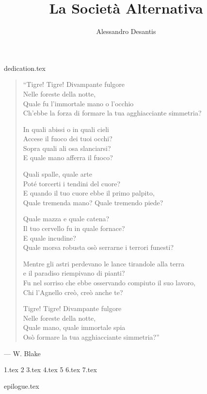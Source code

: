 \documentclass[a4paper,oneside,11pt]{memoir}
\title{La Società Alternativa}
\author{Alessandro Desantis}
\date{}
\begin{document}
    \begin{titlingpage}
        \maketitle
    \end{titlingpage}

    {dedication.tex}
    \begin{dedicationpage}
        \begin{verse}
            \itshape{
            ``Tigre! Tigre! Divampante fulgore\\
            Nelle foreste della notte,\\
            Quale fu l'immortale mano o l'occhio\\
            Ch'ebbe la forza di formare la tua agghiacciante simmetria?

            In quali abissi o in quali cieli\\
            Accese il fuoco dei tuoi occhi?\\
            Sopra quali ali osa slanciarsi?\\
            E quale mano afferra il fuoco?

            Quali spalle, quale arte\\
            Poté torcerti i tendini del cuore?\\
            E quando il tuo cuore ebbe il primo palpito,\\
            Quale tremenda mano? Quale tremendo piede?

            Quale mazza e quale catena?\\
            Il tuo cervello fu in quale fornace?\\
            E quale incudine?\\
            Quale morsa robusta osò serrarne i terrori funesti?

            Mentre gli astri perdevano le lance tirandole alla terra\\
            e il paradiso riempivano di pianti?\\
            Fu nel sorriso che ebbe osservando compiuto il suo lavoro,\\
            Chi l'Agnello creò, creò anche te?

            Tigre! Tigre! Divampante fulgore\\
            Nelle foreste della notte,\\
            Quale mano, quale immortale spia\\
            Osò formare la tua agghiacciante simmetria?''
            \/}
        \end{verse}

        \begin{flushright}
            --- W. Blake
        \end{flushright}
    \end{dedicationpage}


    {1.tex}
    {2}
    {3.tex}
    {4.tex}
    {5}
    {6.tex}
    {7.tex}

    \backmatter

    {epilogue.tex}
\end{document}
